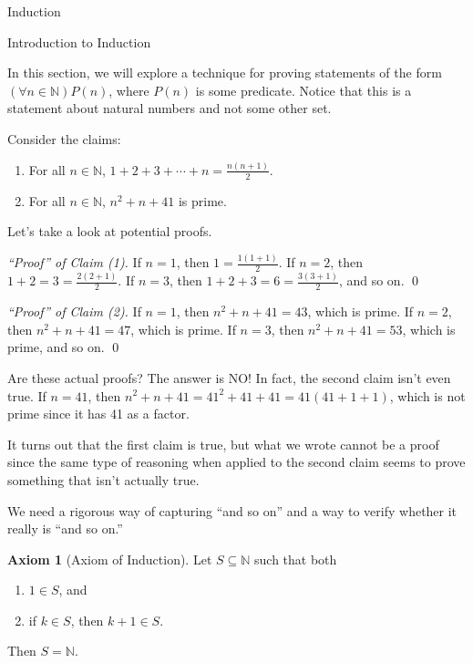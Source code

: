 \documentclass[11pt]{article}
\theoremstyle{definition}
\newtheorem{axiom}[theorem]{Axiom}
\begin{document}
\addtocounter{section}{3}

\begin{section}{Induction}


\begin{subsection}{Introduction to Induction}

In this section, we will explore a technique for proving statements of the form $(\forall n \in \mathbb{N})P(n)$, where $P(n)$ is some predicate.  Notice that this is a statement about natural numbers and not some other set.

Consider the claims:
\begin{enumerate}
\item For all $n\in\mathbb{N}$, $\displaystyle 1+2+3+\cdots +n=\frac{n(n+1)}{2}$.
\item For all $n\in\mathbb{N}$, $n^{2}+n+41$ is prime.
\end{enumerate}
Let's take a look at potential proofs.

\bigskip

\noindent \emph{``Proof'' of Claim (1).} If $n=1$, then $1=\frac{1(1+1)}{2}$.  If $n=2$, then $1+2=3=\frac{2(2+1)}{2}$.  If $n=3$, then $1+2+3=6=\frac{3(3+1)}{2}$, and so on. \hfill \qed

\bigskip

\noindent \emph{``Proof'' of Claim (2).} If $n=1$, then $n^{2}+n+41=43$, which is prime.  If $n=2$, then $n^{2}+n+41=47$, which is prime.  If $n=3$, then $n^{2}+n+41=53$, which is prime, and so on. \hfill \qed

\bigskip

Are these actual proofs?  The answer is NO!  In fact, the second claim isn't even true.  If $n=41$, then $n^{2}+n+41=41^{2}+41+41=41(41+1+1)$, which is not prime since it has 41 as a factor.

It turns out that the first claim is true, but what we wrote cannot be a proof since the same type of reasoning when applied to the second claim seems to prove something that isn't actually true.

We need a rigorous way of capturing ``and so on'' and a way to verify whether it really is ``and so on.''

\begin{axiom}[Axiom of Induction]
Let $S\subseteq \mathbb{N}$ such that both
\begin{enumerate}
\item $1\in S$, and
\item if $k\in S$, then $k+1\in S$.
\end{enumerate}
Then $S=\mathbb{N}$.
\end{axiom}


\end{subsection}
\end{section}
\end{document}
